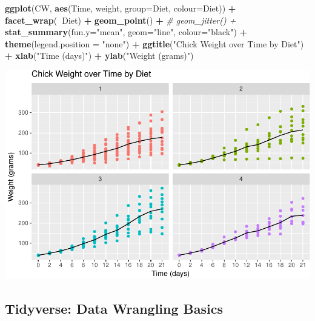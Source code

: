 \documentclass[]{book}
\newenvironment{Shaded}{\begin{snugshade}}{\end{snugshade}}
\newcommand{\CommentTok}[1]{\textcolor[rgb]{0.56,0.35,0.01}{\textit{#1}}}
\newcommand{\DataTypeTok}[1]{\textcolor[rgb]{0.13,0.29,0.53}{#1}}
\newcommand{\KeywordTok}[1]{\textcolor[rgb]{0.13,0.29,0.53}{\textbf{#1}}}
\newcommand{\NormalTok}[1]{#1}
\newcommand{\OperatorTok}[1]{\textcolor[rgb]{0.81,0.36,0.00}{\textbf{#1}}}
\newcommand{\StringTok}[1]{\textcolor[rgb]{0.31,0.60,0.02}{#1}}
\theoremstyle{definition}
\theoremstyle{definition}
\theoremstyle{definition}
\theoremstyle{remark}
\begin{document}
\begin{Shaded}
\begin{Highlighting}[]
\KeywordTok{ggplot}\NormalTok{(CW, }\KeywordTok{aes}\NormalTok{(Time, weight, }\DataTypeTok{group=}\NormalTok{Diet, }
                             \DataTypeTok{colour=}\NormalTok{Diet)) }\OperatorTok{+}
\StringTok{  }\KeywordTok{facet_wrap}\NormalTok{(}\OperatorTok{~}\NormalTok{Diet) }\OperatorTok{+}
\StringTok{  }\KeywordTok{geom_point}\NormalTok{() }\OperatorTok{+}
\StringTok{  }\CommentTok{# geom_jitter() +}
\StringTok{  }\KeywordTok{stat_summary}\NormalTok{(}\DataTypeTok{fun.y=}\StringTok{"mean"}\NormalTok{, }\DataTypeTok{geom=}\StringTok{"line"}\NormalTok{,}
               \DataTypeTok{colour=}\StringTok{"black"}\NormalTok{) }\OperatorTok{+}
\StringTok{  }\KeywordTok{theme}\NormalTok{(}\DataTypeTok{legend.position =} \StringTok{"none"}\NormalTok{) }\OperatorTok{+}
\StringTok{  }\KeywordTok{ggtitle}\NormalTok{(}\StringTok{"Chick Weight over Time by Diet"}\NormalTok{) }\OperatorTok{+}\StringTok{ }
\StringTok{  }\KeywordTok{xlab}\NormalTok{(}\StringTok{"Time (days)"}\NormalTok{) }\OperatorTok{+}
\StringTok{  }\KeywordTok{ylab}\NormalTok{(}\StringTok{"Weight (grams)"}\NormalTok{)}
\end{Highlighting}
\end{Shaded}

\includegraphics{01-Introduction-to-R_files/figure-latex/finalPlot-1.pdf}

\hypertarget{tidyverse-data-wrangling-basics}{%
\subsection{Tidyverse: Data Wrangling Basics}\label{tidyverse-data-wrangling-basics}}
\end{document}
